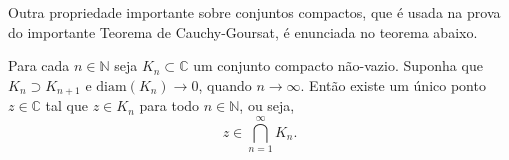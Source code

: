 


Outra propriedade importante sobre conjuntos compactos, que é usada na prova do importante
Teorema de Cauchy-Goursat, é enunciada no teorema abaixo. 

\begin{teorema}
Para cada $n\in\mathbb{N}$ seja $K_n\subset \mathbb{C}$ um conjunto compacto não-vazio. Suponha que $K_{n}\supset K_{n+1}$ e $\mathrm{diam}(K_n)\to 0$, quando $n\to\infty$. Então existe um único ponto $z\in\mathbb{C}$ tal que $z\in K_n$ para todo $n\in\mathbb{N}$, ou seja, 
\[
z\in \bigcap_{n=1}^{\infty} K_n.
\]


\end{teorema}

